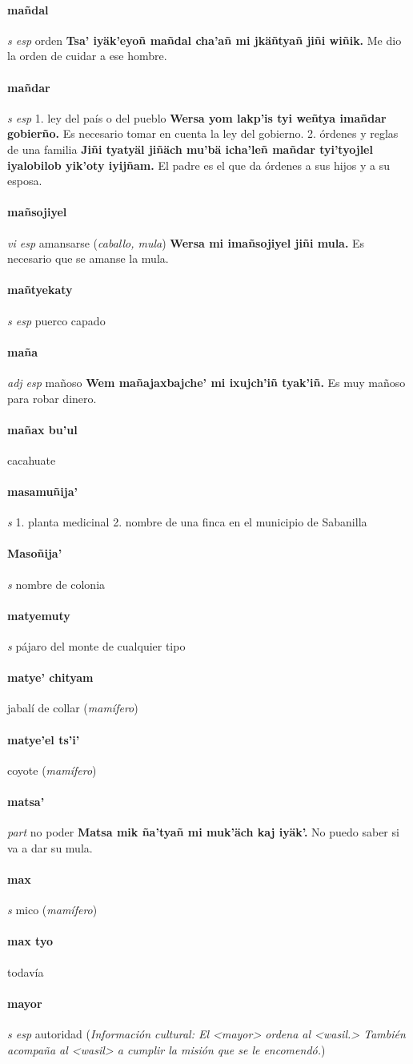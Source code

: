 \documentclass{scrbook}
\newcommand{\entry}[1]{\paragraph{#1}}
\newcommand{\onedefinition}[1]{#1.}
\newcommand{\partofspeech}[1]{\textit{#1}}
\newcommand{\spanishtranslation}[1]{#1}
\newcommand{\clarification}[1]{(\textit{#1})}
\newcommand{\cholexample}[1]{\textbf{#1}}
\newcommand{\exampletranslation}[1]{#1}
\newcommand{\culturalinformation}[1]{(\textit{#1})}
\begin{document}
\begin{multicols}{2}
\entry{mañdal}
\partofspeech{s esp}
\spanishtranslation{orden}
\cholexample{Tsa' iyäk'eyoñ mañdal cha'añ mi jkäñtyañ jiñi wiñik.}
\exampletranslation{Me dio la orden de cuidar a ese hombre.}

\entry{mañdar}
\partofspeech{s esp}
\onedefinition{1}
\spanishtranslation{ley del país o del pueblo}
\cholexample{Wersa yom lakp'is tyi weñtya imañdar gobierño.}
\exampletranslation{Es necesario tomar en cuenta la ley del gobierno.}
\onedefinition{2}
\spanishtranslation{órdenes y reglas de una familia}
\cholexample{Jiñi tyatyäl jiñäch mu'bä icha'leñ mañdar tyi'tyojlel iyalobilob yik'oty iyijñam.}
\exampletranslation{El padre es el que da órdenes a sus hijos y a su esposa.}

\entry{mañsojiyel}
\partofspeech{vi esp}
\spanishtranslation{amansarse}
\clarification{caballo, mula}
\cholexample{Wersa mi imañsojiyel jiñi mula.}
\exampletranslation{Es necesario que se amanse la mula.}

\entry{mañtyekaty}
\partofspeech{s esp}
\spanishtranslation{puerco capado}

\entry{maña}
\partofspeech{adj esp}
\spanishtranslation{mañoso}
\cholexample{Wem mañajaxbajche' mi ixujch'iñ tyak'iñ.}
\exampletranslation{Es muy mañoso para robar dinero.}

\entry{mañax bu'ul}
\spanishtranslation{cacahuate}

\entry{masamuñija'}
\partofspeech{s}
\onedefinition{1}
\spanishtranslation{planta medicinal}
\onedefinition{2}
\spanishtranslation{nombre de una finca en el municipio de Sabanilla}

\entry{Masoñija'}
\partofspeech{s}
\spanishtranslation{nombre de colonia}

\entry{matyemuty}
\partofspeech{s}
\spanishtranslation{pájaro del monte de cualquier tipo}

\entry{matye' chityam}
\spanishtranslation{jabalí de collar}
\clarification{mamífero}

\entry{matye'el ts'i'}
\spanishtranslation{coyote}
\clarification{mamífero}

\entry{matsa'}
\partofspeech{part}
\spanishtranslation{no poder}
\cholexample{Matsa mik ña'tyañ mi muk'äch kaj iyäk'.}
\exampletranslation{No puedo saber si va a dar su mula.}

\entry{max}
\partofspeech{s}
\spanishtranslation{mico}
\clarification{mamífero}

\entry{max tyo}
\spanishtranslation{todavía}

\entry{mayor}
\partofspeech{s esp}
\spanishtranslation{autoridad}
\culturalinformation{Información cultural: El <mayor> ordena al <wasil.> También acompaña al <wasil> a cumplir la misión que se le encomendó.}


\end{multicols}
\end{document}

